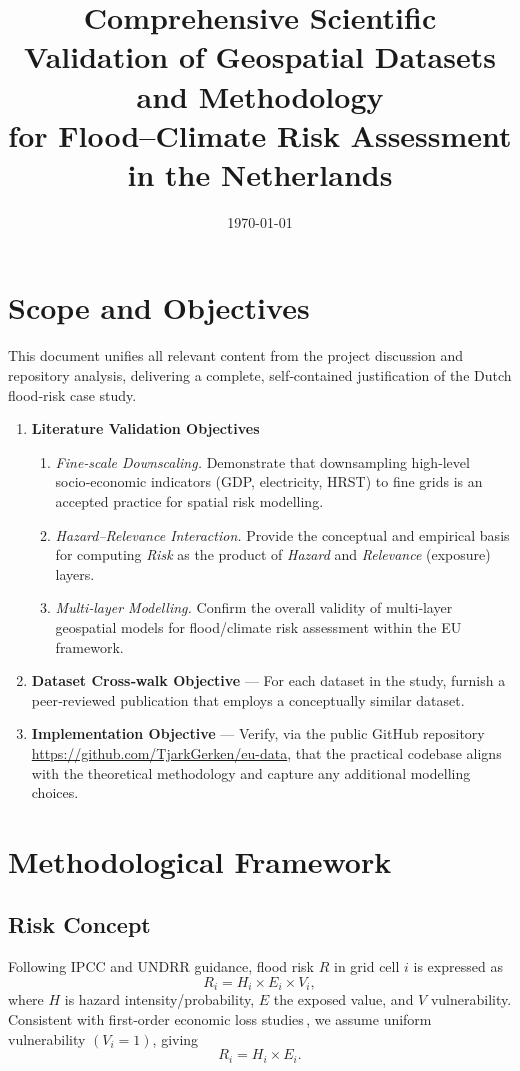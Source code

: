 \documentclass[a4paper,11pt]{article}
\title{Comprehensive Scientific Validation of Geospatial Datasets and Methodology\\for Flood--Climate Risk Assessment in the Netherlands}
\author{}
\date{\today}
\begin{document}
\maketitle
\tableofcontents
\newpage

\section{Scope and Objectives}
This document unifies all relevant content from the project discussion and repository analysis, delivering a complete, self‑contained justification of the Dutch flood‑risk case study.

\begin{enumerate}[leftmargin=*]
  \item \textbf{Literature Validation Objectives}
  \begin{enumerate}[label=\Alph*.]
    \item \emph{Fine‑scale Downscaling.} Demonstrate that downsampling high‑level socio‑economic indicators (GDP, electricity, HRST) to fine grids is an accepted practice for spatial risk modelling.
    \item \emph{Hazard–Relevance Interaction.} Provide the conceptual and empirical basis for computing \emph{Risk} as the product of \emph{Hazard} and \emph{Relevance} (exposure) layers.
    \item \emph{Multi‑layer Modelling.} Confirm the overall validity of multi‑layer geospatial models for flood/climate risk assessment within the EU framework.
  \end{enumerate}
  \item \textbf{Dataset Cross‑walk Objective} — For each dataset in the study, furnish a peer‑reviewed publication that employs a conceptually similar dataset.
  \item \textbf{Implementation Objective} — Verify, via the public GitHub repository \url{https://github.com/TjarkGerken/eu-data}, that the practical codebase aligns with the theoretical methodology and capture any additional modelling choices.
\end{enumerate}

\section{Methodological Framework}
\subsection{Risk Concept}
Following IPCC and UNDRR guidance, flood risk $R$ in grid cell $i$ is expressed as
\begin{equation}\label{eq:risk_full}
R_i = H_i \times E_i \times V_i ,
\end{equation}
where $H$ is hazard intensity/probability, $E$ the exposed value, and $V$ vulnerability. Consistent with first‑order economic loss studies\,\citep{Alfieri2016,Willner2018}, we assume uniform vulnerability $(V_i = 1)$, giving
\begin{equation}
\label{eq:risk_simple}
R_i = H_i \times E_i .
\end{equation}
\end{document}
